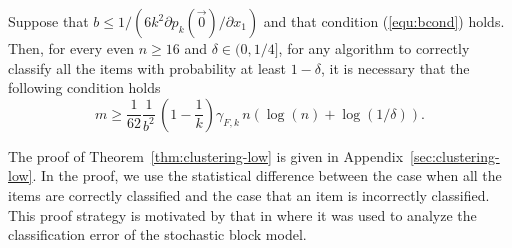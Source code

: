 \begin{theorem} Suppose that $b \le 1/(6 k^2\partial p_k(\vec{0})/\partial x_1)$ and that condition (\ref{equ:bcond}) holds. Then, for every even $n \geq 16$ and $\delta \in (0,1/4]$, for any algorithm to correctly classify all the items with probability at least $1-\delta$, it is necessary that the following condition holds
$$
m \geq \frac{1}{62}\frac{1}{b^2}\, \left(1-\frac{1}{k}\right)\gamma_{F,k}\, n(\log(n) + \log(1/\delta)).
$$
\label{thm:clustering-low}
\end{theorem}

The proof of Theorem~\ref{thm:clustering-low} is given in Appendix~\ref{sec:clustering-low}. In the proof, we use the statistical difference between the case when all the items are correctly classified and the case that an item is incorrectly classified. This proof strategy is motivated by that in \cite{yun2014community} where it was used to analyze the classification error of the stochastic block model.
